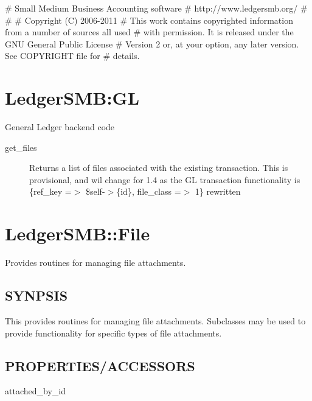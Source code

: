 \begin{description}
\begin{description}
\begin{description}
\begin{description}
\begin{description}
\begin{description}
\# Small Medium Business Accounting software
\# http://www.ledgersmb.org/
\#
\#
\# Copyright (C) 2006-2011
\# This work contains copyrighted information from a number of sources all used
\# with permission.  It is released under the GNU General Public License
\# Version 2 or, at your option, any later version.  See COPYRIGHT file for
\# details.

\section{LedgerSMB:GL\label{LedgerSMB:GL}}


General Ledger backend code

\begin{description}

\item[{get\_files}] \mbox{}

Returns a list of files associated with the existing transaction.  This is 
provisional, and wil change for 1.4 as the GL transaction functionality is 
                  \{ref\_key =$>$ \$self-$>$\{id\}, file\_class =$>$ 1\}
rewritten

\end{description}
\section{LedgerSMB::File\label{LedgerSMB::File}}


Provides routines for managing file attachments.

\subsection*{SYNPSIS\label{LedgerSMB::File_SYNPSIS}}


This provides routines for managing file attachments.  Subclasses may be used
to provide functionality for specific types of file attachments.

\subsection*{PROPERTIES/ACCESSORS\label{LedgerSMB::File_PROPERTIES_ACCESSORS}}
\begin{description}

\item[{attached\_by\_id}] \mbox{}


\end{description}
\end{description}
\end{description}
\end{description}
\end{description}
\end{description}
\end{description}
